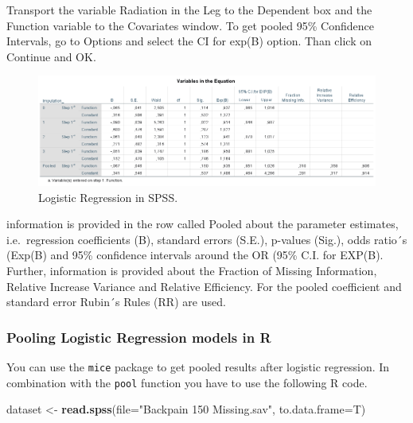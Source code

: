 \documentclass[
]{book}
\newenvironment{Shaded}{\begin{snugshade}}{\end{snugshade}}
\newcommand{\DataTypeTok}[1]{\textcolor[rgb]{0.13,0.29,0.53}{#1}}
\newcommand{\KeywordTok}[1]{\textcolor[rgb]{0.13,0.29,0.53}{\textbf{#1}}}
\newcommand{\NormalTok}[1]{#1}
\newcommand{\StringTok}[1]{\textcolor[rgb]{0.31,0.60,0.02}{#1}}
\begin{document}
Transport the variable Radiation in the Leg to the Dependent box and the Function variable to the Covariates window. To get pooled 95\% Confidence Intervals, go to Options and select the CI for exp(B) option. Than click on Continue and OK.

\begin{figure}

{\centering \includegraphics[width=0.9\linewidth]{images/table5.9} 

}

\caption{Logistic Regression in SPSS.}\label{fig:tab5-9}
\end{figure}

information is provided in the row called Pooled about the parameter estimates, i.e.~regression coefficients (B), standard errors (S.E.), p-values (Sig.), odds ratio´s (Exp(B) and 95\% confidence intervals around the OR (95\% C.I. for EXP(B). Further, information is provided about the Fraction of Missing Information, Relative Increase Variance and Relative Efficiency. For the pooled coefficient and standard error Rubin´s Rules (RR) are used.

\hypertarget{pooling-logistic-regression-models-in-r}{%
\subsubsection{Pooling Logistic Regression models in R}\label{pooling-logistic-regression-models-in-r}}

You can use the \texttt{mice} package to get pooled results after logistic regression. In combination with the \texttt{pool} function you have to use the following R code.

\begin{Shaded}
\begin{Highlighting}[]
\NormalTok{dataset <-}\StringTok{ }\KeywordTok{read.spss}\NormalTok{(}\DataTypeTok{file=}\StringTok{"Backpain 150 Missing.sav"}\NormalTok{, }\DataTypeTok{to.data.frame=}\NormalTok{T)}
\end{Highlighting}
\end{Shaded}
\end{document}
